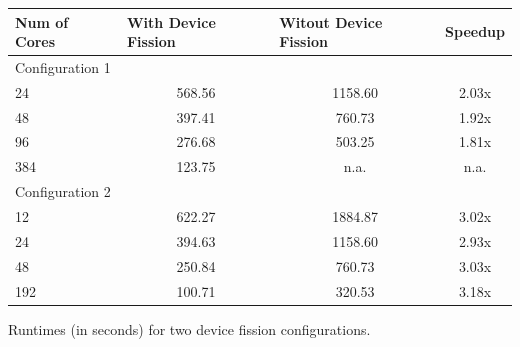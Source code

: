 \begin{tablehere}
{\footnotesize
\begin{tabular}{|p{}|p{}|p{}|p{}|}
\hline
       Num of Cores		& \multicolumn{1}{|p{1,55cm}}{With Device Fission}& \multicolumn{1}{|p{1,55cm}}{Witout Device Fission}& \multicolumn{1}{|p{1,55cm}|}{Speedup} \\ \hline
\multicolumn{1}{|l}{Configuration 1} & \multicolumn{1}{c}{}  & \multicolumn{1}{c}{}  & \multicolumn{1}{c|}{}  \\ \hline
      24  & \multicolumn{1}{|c}{568.56} & \multicolumn{1}{|c}{1158.60} & \multicolumn{1}{|c|}{2.03x} \\ \hline
			48  & \multicolumn{1}{|c}{397.41} & \multicolumn{1}{|c}{760.73} & \multicolumn{1}{|c|}{1.92x} \\ \hline
      96  & \multicolumn{1}{|c}{276.68} & \multicolumn{1}{|c}{503.25} & \multicolumn{1}{|c|}{1.81x} \\ \hline
      384  & \multicolumn{1}{|c}{123.75} & \multicolumn{1}{|c}{n.a.} & \multicolumn{1}{|c|}{n.a.} \\ \hline

\multicolumn{1}{|l}{Configuration 2} & \multicolumn{1}{l}{}  & \multicolumn{1}{l}{}  & \multicolumn{1}{l|}{}  \\ \hline
      12  & \multicolumn{1}{|c}{622.27} & \multicolumn{1}{|c}{1884.87} & \multicolumn{1}{|c|}{3.02x} \\ \hline
			24  & \multicolumn{1}{|c}{394.63} & \multicolumn{1}{|c}{1158.60} & \multicolumn{1}{|c|}{2.93x} \\ \hline
      48  & \multicolumn{1}{|c}{250.84} & \multicolumn{1}{|c}{760.73} & \multicolumn{1}{|c|}{3.03x} \\ \hline
      192  & \multicolumn{1}{|c}{100.71} & \multicolumn{1}{|c}{320.53} & \multicolumn{1}{|c|}{3.18x} \\ \hline
\end{tabular}}
  \caption{Runtimes (in seconds) for two device fission configurations.}
	\label{tab:LUDeviceFission}
\end{tablehere}








